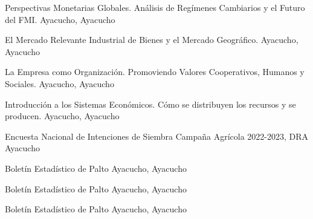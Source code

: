 
\begin{scholarship}

	{Perspectivas Monetarias Globales. Análisis de Regímenes Cambiarios y el Futuro del FMI. Ayacucho, Ayacucho}
	
	{El Mercado Relevante Industrial de Bienes y el Mercado Geográfico. Ayacucho, Ayacucho}
	
	{La Empresa como Organización. Promoviendo Valores Cooperativos, Humanos y Sociales. Ayacucho, Ayacucho}
	
	{Introducción a los Sistemas Económicos. Cómo se distribuyen los recursos y se producen. Ayacucho, Ayacucho}

	{Encuesta Nacional de Intenciones de Siembra Campaña Agrícola 2022-2023, DRA Ayacucho}

	{Boletín Estadístico de Palto Ayacucho, Ayacucho}
	
	{Boletín Estadístico de Palto Ayacucho, Ayacucho}
	
	{Boletín Estadístico de Palto Ayacucho, Ayacucho}

\end{scholarship}